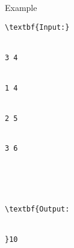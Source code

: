 Example
\begin{verbatim}
\textbf{Input:}


3 4


1 4


2 5


3 6





\textbf{Output:


}10


\end{verbatim}